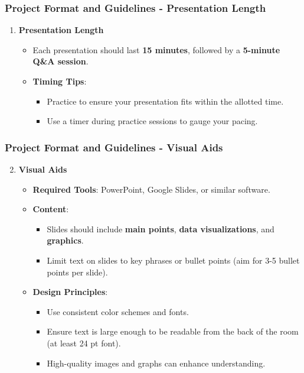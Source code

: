 \documentclass{beamer}
\begin{document}
\begin{frame}[fragile]
    \frametitle{Project Format and Guidelines - Presentation Length}
    \begin{enumerate}
        \item \textbf{Presentation Length}
            \begin{itemize}
                \item Each presentation should last \textbf{15 minutes}, followed by a \textbf{5-minute Q\&A session}.
                \item \textbf{Timing Tips}:
                    \begin{itemize}
                        \item Practice to ensure your presentation fits within the allotted time.
                        \item Use a timer during practice sessions to gauge your pacing.
                    \end{itemize}
            \end{itemize}
    \end{enumerate}
\end{frame}

\begin{frame}[fragile]
    \frametitle{Project Format and Guidelines - Visual Aids}
    \begin{enumerate}
        \setcounter{enumi}{1}
        \item \textbf{Visual Aids}
            \begin{itemize}
                \item \textbf{Required Tools}: PowerPoint, Google Slides, or similar software.
                \item \textbf{Content}:
                    \begin{itemize}
                        \item Slides should include \textbf{main points}, \textbf{data visualizations}, and \textbf{graphics}.
                        \item Limit text on slides to key phrases or bullet points (aim for 3-5 bullet points per slide).
                    \end{itemize}
                \item \textbf{Design Principles}:
                    \begin{itemize}
                        \item Use consistent color schemes and fonts.
                        \item Ensure text is large enough to be readable from the back of the room (at least 24 pt font).
                        \item High-quality images and graphs can enhance understanding.
                    \end{itemize}
            \end{itemize}
    \end{enumerate}
\end{frame}
\end{document}
